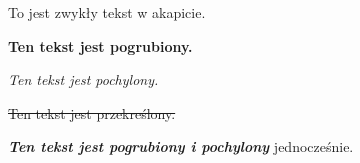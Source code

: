 \documentclass{article}
\begin{document}
To jest zwykły tekst w akapicie.




\textbf{Ten tekst jest pogrubiony.}




\textit{Ten tekst jest pochylony.}




\sout{Ten tekst jest przekreślony.}




\textbf{\textit{Ten tekst jest pogrubiony i pochylony}} jednocześnie.
\end{document}
